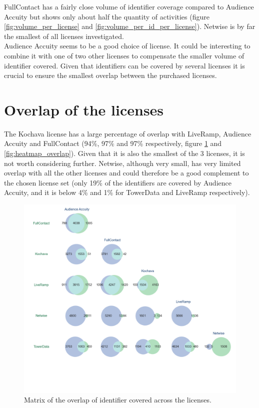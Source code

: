 \documentclass[11pt]{article} %
\begin{document}
FullContact has a fairly close volume of identifier coverage compared to Audience Accuity but shows only about half the quantity of activities (figure \ref{fig:volume_per_license} and \ref{fig:volume_per_id_per_license}). Netwise is by far the smallest of all licenses investigated.\\


Audience Accuity seems to be a good choice of license. It could be interesting to combine it with one of two other licenses to compensate the smaller volume of identifier covered. Given that identifiers can be covered by several licenses it is crucial to ensure the smallest overlap between the purchased licenses.\\

\clearpage
\newpage
\section{Overlap of the licenses}
The Kochava license has a large percentage of overlap with LiveRamp, Audience Accuity and FullContact (94\%, 97\% and 97\% respectively, figure \ref{fig:venn_matrix} and \ref{fig:heatmap_overlap}). Given that it is also the smallest of the 3 licenses, it is not worth considering further. Netwise, although very small, has very limited overlap with all the other licenses and could therefore be a good complement to the chosen license set (only 19\% of the identifiers are covered by Audience Accuity, and it is below 4\% and 1\% for TowerData and LiveRamp respectively).
\begin{figure}[h!]
  \includegraphics[width=1.1\linewidth]{../outputs/venn_matrix.png}
  \caption{Matrix of the overlap of identifier covered across the licenses.}
  \label{fig:venn_matrix}
\end{figure}
\end{document}
